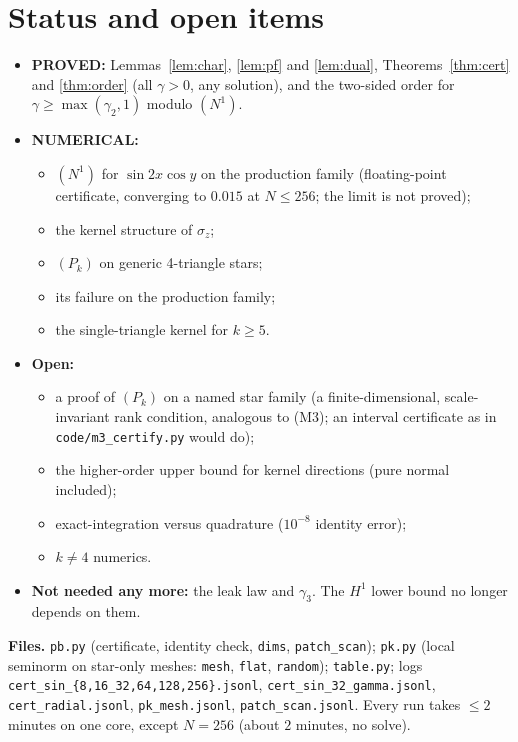 \documentclass[11pt]{article}
\theoremstyle{remark}
\begin{document}
\section{Status and open items}
\begin{itemize}
\item \textbf{PROVED:} Lemmas~\ref{lem:char}, \ref{lem:pf} and \ref{lem:dual}, Theorems~\ref{thm:cert} and \ref{thm:order}
(all $\gamma>0$, any solution), and the two-sided order for $\gamma\ge\max(\gamma_2,1)$ modulo $(N^1)$.
\item \textbf{NUMERICAL:}
 \begin{itemize}
 \item $(N^1)$ for $\sin2x\cos y$ on the production family (floating-point certificate, converging to $0.015$ at $N\le256$; the
 limit is not proved);
 \item the kernel structure of $\sigma_z$;
 \item $(P_k)$ on generic 4-triangle stars;
 \item its failure on the production family;
 \item the single-triangle kernel for $k\ge5$.
 \end{itemize}
\item \textbf{Open:}
 \begin{itemize}
 \item a proof of $(P_k)$ on a named star family (a finite-dimensional, scale-invariant rank condition, analogous to (M3); an
 interval certificate as in \texttt{code/m3\_certify.py} would do);
 \item the higher-order upper bound for kernel directions (pure normal included);
 \item exact-integration versus quadrature ($10^{-8}$ identity error);
 \item $k\ne4$ numerics.
 \end{itemize}
\item \textbf{Not needed any more:} the leak law and $\gamma_3$. The $H^1$ lower bound no longer depends on them.
\end{itemize}

\noindent\textbf{Files.} \texttt{pb.py} (certificate, identity check, \texttt{dims}, \texttt{patch\_scan}); \texttt{pk.py}
(local seminorm on star-only meshes: \texttt{mesh}, \texttt{flat}, \texttt{random}); \texttt{table.py}; logs
\texttt{cert\_sin\_\{8,16\_32,64,128,256\}.jsonl}, \texttt{cert\_sin\_32\_gamma.jsonl}, \texttt{cert\_radial.jsonl},
\texttt{pk\_mesh.jsonl}, \texttt{patch\_scan.jsonl}. Every run takes $\le2$ minutes on one core, except $N=256$ (about
$2$ minutes, no solve).
\end{document}
